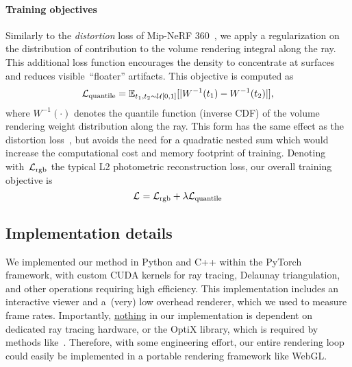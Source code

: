 \paragraph{Training objectives}
% 
Similarly to the \textit{distortion} loss of Mip-NeRF 360~\cite{mipnerf360}, we apply a regularization on the distribution of contribution to the volume rendering integral along the ray.
This additional loss function encourages the density to concentrate at surfaces and reduces visible~``floater'' artifacts.
This objective is computed as
%
\begin{align}
\mathcal{L}_\text{quantile} = \mathbb{E}_{t_1, t_2\sim\mathcal{U}[0, 1]}[|W^{-1}(t_1) - W^{-1}(t_2)|],
\end{align}
%
where $W^{-1}(\cdot)$ denotes the quantile function (inverse CDF) of the volume rendering weight distribution along the ray.
This form has the same effect as the distortion loss~\cite{mipnerf360}, but avoids the need for a quadratic nested sum which would increase the computational cost and memory footprint of training.
% 
Denoting with~$\mathcal{L}_\text{rgb}$ the typical L2 photometric reconstruction loss, our overall training objective is
% 
\begin{equation}
\mathcal{L}_\text{} = \mathcal{L}_\text{rgb} + \lambda \mathcal{L}_\text{quantile}
\end{equation}


\subsection{Implementation details}
\label{sec:implementation}
% 
We implemented our method in Python and C++ within the PyTorch framework, with custom CUDA kernels for ray tracing, Delaunay triangulation, and other operations requiring high efficiency.
This implementation includes an interactive viewer and a~(very) low overhead renderer, which we used to measure frame rates.
Importantly, \ul{nothing} in our implementation is dependent on 
dedicated ray tracing hardware, or the OptiX library, which is required by methods like~\cite{3dgrt}.
Therefore, with some engineering effort, our entire rendering loop could easily be implemented in a portable rendering framework like WebGL.

